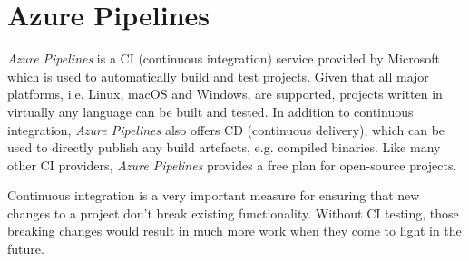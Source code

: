 \section{Azure Pipelines}

\textit{Azure Pipelines} is a CI (continuous integration) service provided by Microsoft which is
used to automatically build and test projects. Given that all major platforms, i.e. Linux, macOS and
Windows, are supported, projects written in virtually any language can be built and tested. In
addition to continuous integration, \textit{Azure Pipelines} also offers CD (continuous delivery),
which can be used to directly publish any build artefacts, e.g. compiled binaries. Like many other
CI providers, \textit{Azure Pipelines} provides a free plan for open-source projects.
\cite{azure-pipelines}

Continuous integration is a very important measure for ensuring that new changes to a project don't
break existing functionality. Without CI testing, those breaking changes would result in much more
work when they come to light in the future.
